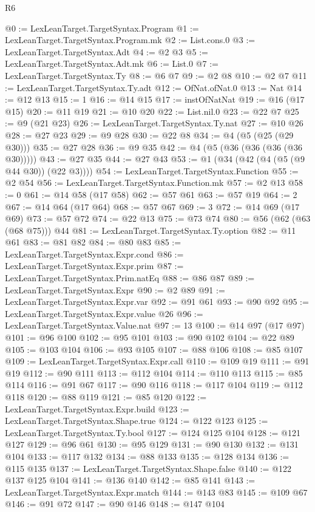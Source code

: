 \begin{lexlean}{R6}
\begin{coremodule}
@0 := LexLeanTarget.TargetSyntax.Program
@1 := LexLeanTarget.TargetSyntax.Program.mk
@2 := List.cons.{0}
@3 := LexLeanTarget.TargetSyntax.Adt
@4 := @2 @3
@5 := LexLeanTarget.TargetSyntax.Adt.mk
@6 := List.{0}
@7 := LexLeanTarget.TargetSyntax.Ty
@8 := @6 @7
@9 := @2 @8
@10 := @2 @7
@11 := LexLeanTarget.TargetSyntax.Ty.adt
@12 := OfNat.ofNat.{0}
@13 := Nat
@14 := @12 @13
@15 := 1
@16 := @14 @15
@17 := instOfNatNat
@19 := @16 (@17 @15)
@20 := @11 @19
@21 := @10 @20
@22 := List.nil.{0}
@23 := @22 @7
@25 := @9 (@21 @23)
@26 := LexLeanTarget.TargetSyntax.Ty.nat
@27 := @10 @26
@28 := @27 @23
@29 := @9 @28
@30 := @22 @8
@34 := @4 (@5 (@25 (@29 @30)))
@35 := @27 @28
@36 := @9 @35
@42 := @4 (@5 (@36 (@36 (@36 (@36 @30)))))
@43 := @27 @35
@44 := @27 @43
@53 := @1 (@34 (@42 (@4 (@5 (@9 @44 @30)) (@22 @3))))
@54 := LexLeanTarget.TargetSyntax.Function
@55 := @2 @54
@56 := LexLeanTarget.TargetSyntax.Function.mk
@57 := @2 @13
@58 := 0
@61 := @14 @58 (@17 @58)
@62 := @57 @61
@63 := @57 @19
@64 := 2
@67 := @14 @64 (@17 @64)
@68 := @57 @67
@69 := 3
@72 := @14 @69 (@17 @69)
@73 := @57 @72
@74 := @22 @13
@75 := @73 @74
@80 := @56 (@62 (@63 (@68 @75))) @44
@81 := LexLeanTarget.TargetSyntax.Ty.option
@82 := @11 @61
@83 := @81 @82
@84 := @80 @83
@85 := LexLeanTarget.TargetSyntax.Expr.cond
@86 := LexLeanTarget.TargetSyntax.Expr.prim
@87 := LexLeanTarget.TargetSyntax.Prim.natEq
@88 := @86 @87
@89 := LexLeanTarget.TargetSyntax.Expr
@90 := @2 @89
@91 := LexLeanTarget.TargetSyntax.Expr.var
@92 := @91 @61
@93 := @90 @92
@95 := LexLeanTarget.TargetSyntax.Expr.value @26
@96 := LexLeanTarget.TargetSyntax.Value.nat
@97 := 13
@100 := @14 @97 (@17 @97)
@101 := @96 @100
@102 := @95 @101
@103 := @90 @102
@104 := @22 @89
@105 := @103 @104
@106 := @93 @105
@107 := @88 @106
@108 := @85 @107
@109 := LexLeanTarget.TargetSyntax.Expr.call
@110 := @109 @19
@111 := @91 @19
@112 := @90 @111
@113 := @112 @104
@114 := @110 @113
@115 := @85 @114
@116 := @91 @67
@117 := @90 @116
@118 := @117 @104
@119 := @112 @118
@120 := @88 @119
@121 := @85 @120
@122 := LexLeanTarget.TargetSyntax.Expr.build
@123 := LexLeanTarget.TargetSyntax.Shape.true
@124 := @122 @123
@125 := LexLeanTarget.TargetSyntax.Ty.bool
@127 := @124 @125 @104
@128 := @121 @127
@129 := @96 @61
@130 := @95 @129
@131 := @90 @130
@132 := @131 @104
@133 := @117 @132
@134 := @88 @133
@135 := @128 @134
@136 := @115 @135
@137 := LexLeanTarget.TargetSyntax.Shape.false
@140 := @122 @137 @125 @104
@141 := @136 @140
@142 := @85 @141
@143 := LexLeanTarget.TargetSyntax.Expr.match
@144 := @143 @83
@145 := @109 @67
@146 := @91 @72
@147 := @90 @146
@148 := @147 @104

\end{coremodule}
\end{lexlean}
